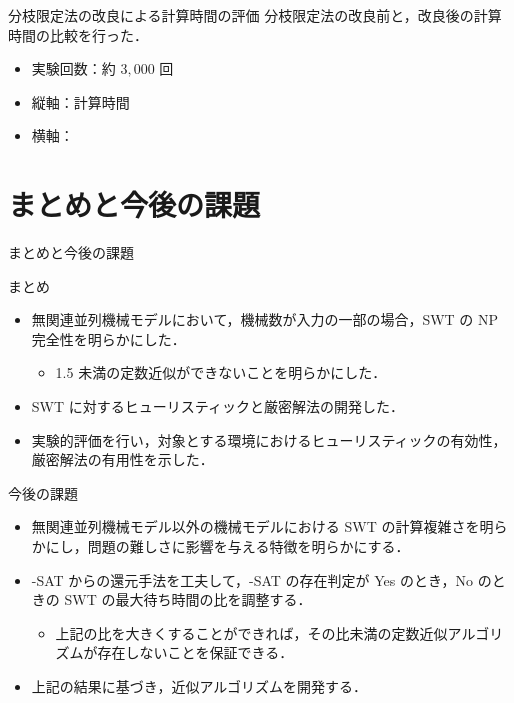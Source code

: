 \documentclass[dvipdfmx]{beamer}
\begin{document}
    \begin{frame}{分枝限定法の改良による計算時間の評価}
      分枝限定法の改良前と，改良後の計算時間の比較を行った．
      \begin{itemize}
        \item 実験回数：約 $3,000$ 回
        \item 縦軸：計算時間
        \item 横軸：
      \end{itemize}

    \end{frame}
    \section{まとめと今後の課題}
    \begin{frame}{まとめと今後の課題}
      \begin{block}{まとめ}
        \begin{itemize}
          \item 無関連並列機械モデルにおいて，機械数が入力の一部の場合，SWT の NP 完全性を明らかにした．
          \begin{itemize}
            \item 1.5 未満の定数近似ができないことを明らかにした．
          \end{itemize}
          \item SWT に対するヒューリスティックと厳密解法の開発した．
          \item 実験的評価を行い，対象とする環境におけるヒューリスティックの有効性，厳密解法の有用性を示した．
        \end{itemize}
      \end{block}
      \begin{alertblock}{今後の課題}
        \begin{itemize}
          \item 無関連並列機械モデル以外の機械モデルにおける SWT の計算複雑さを明らかにし，問題の難しさに影響を与える特徴を明らかにする．
          \item {-SAT} からの還元手法を工夫して，{-SAT} の存在判定が Yes のとき，No のときの SWT の最大待ち時間の比を調整する．
          \begin{itemize}
            \item 上記の比を大きくすることができれば，その比未満の定数近似アルゴリズムが存在しないことを保証できる．
          \end{itemize}
          \item 上記の結果に基づき，近似アルゴリズムを開発する．
        \end{itemize}
      \end{alertblock}
    \end{frame}
\end{document}
